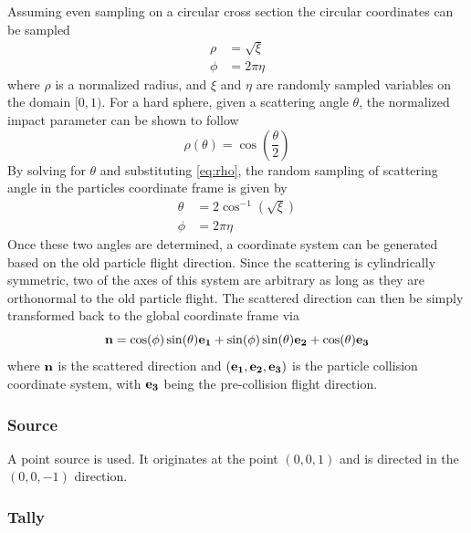\documentclass{mc2015}
\begin{document}
Assuming even sampling on a circular cross section the circular coordinates can be sampled
\begin{subequations}
\begin{align}
	\rho &= \sqrt{\xi} \label{eq:rho}\\
	\phi &= 2\pi\eta \label{eq:phi1}
\end{align}
\end{subequations}
where $\rho$ is a normalized radius, and $\xi$ and $\eta$ are randomly sampled variables
on the domain $[0,1)$.
For a hard sphere, given a scattering angle $\theta$,
the normalized impact parameter can be shown to follow
\begin{equation}
	\rho(\theta) = \cos\left(\frac{\theta}{2}\right) \label{eq:impact}
\end{equation}
By solving for $\theta$ and substituting \autoref{eq:rho},
the random sampling of scattering angle in the particles coordinate frame is given by
\begin{subequations}
\begin{align}
	\theta &= 2\cos^{-1}\left(\sqrt{\xi}\right) \label{eq:theta}\\
	\phi &= 2\pi\eta \label{eq:phi2}
\end{align}
\end{subequations}
Once these two angles are determined,
a coordinate system can be generated based on the old particle flight direction.
Since the scattering is cylindrically symmetric, two of the axes of this system
are arbitrary as long as they are orthonormal to the old particle flight.
The scattered direction can then be simply transformed
back to the global coordinate frame via
\begin{equation}
	\bf{n} = \cos(\phi)\sin(\theta)\bf{e_1} + \sin(\phi)\sin(\theta)\bf{e_2}
			+ \cos(\theta)\bf{e_3}
\end{equation}
where $\bf{n}$ is the scattered direction and $(\bf{e_1},\bf{e_2},\bf{e_3})$
is the particle collision coordinate system,
with $\bf{e_3}$ being the pre-collision flight direction.

\subsubsection{Source}

A point source is used.
It originates at the point $(0,0,1)$ and is directed in the $(0,0,-1)$ direction.

\subsubsection{Tally}
\end{document}
